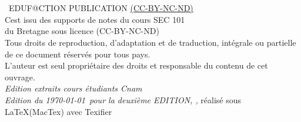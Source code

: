


\newpage

~\vfill
\thispagestyle{empty}

\INFOGitHubS

\noindent {\Huge\ccbyncndeu}\\ 

\noindent \the\year~EDUF@CTION PUBLICATION \href{https://creativecommons.org/licenses/by-nc-nd/2.0/fr/}{(CC-BY-NC-ND)}\\ %

\noindent C\edoc est issu des supports de notes du cours SEC 101\\ 
du \uCnam Bretagne sous licence (CC-BY-NC-ND)\\






\noindent Tous droits de reproduction, d’adaptation et de traduction, intégrale ou partielle de ce document réservés pour tous pays.\\

\noindent L’auteur est seul propriétaire des droits et responsable du contenu de cet ouvrage.\\

\noindent \textit{Edition extraits cours étudiants Cnam} \\

\noindent \textit{Edition du \today~pour la deuxième EDITION,  \printer, } réalisé sous \LaTeX (MacTex) avec Texifier \faApple


